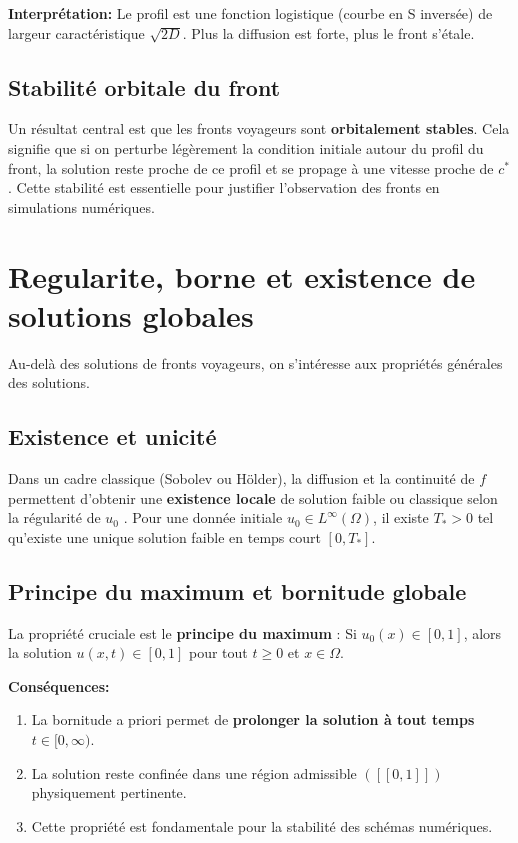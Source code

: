 \documentclass[11pt,a4paper]{report}
\begin{document}
\textbf{Interprétation:} Le profil est une fonction logistique (courbe en S inversée) 
de largeur caractéristique $\sqrt{2D}$. Plus la diffusion est forte, plus le front s'étale.

\subsection*{Stabilité orbitale du front}
Un résultat central est que les fronts voyageurs sont \textbf{orbitalement stables}.
Cela signifie que si on perturbe légèrement la condition initiale autour du profil du front,
la solution reste proche de ce profil et se propage à une vitesse proche de $c^*$.
Cette stabilité est essentielle pour justifier l'observation des fronts en simulations numériques.

\section{Regularite, borne et existence de solutions globales}
Au-delà des solutions de fronts voyageurs, on s'intéresse aux propriétés générales des solutions.

\subsection*{Existence et unicité}
Dans un cadre classique (Sobolev ou Hölder), la diffusion et la continuité de $f$ permettent d'obtenir une
\textbf{existence locale} de solution faible ou classique selon la régularité de $u_0$ \cite{EvansGariepy2015}.
Pour une donnée initiale $u_0 \in L^\infty(\Omega)$, il existe $T_* > 0$ tel qu'existe une unique solution
faible en temps court $[0, T_*]$.

\subsection*{Principe du maximum et bornitude globale}
La propriété cruciale est le \textbf{principe du maximum} \cite{FifeMcLeod1977}:
Si $u_0(x) \in [0,1]$, alors la solution $u(x,t) \in [0,1]$ pour tout $t \geq 0$ et $x \in \Omega$.

\textbf{Conséquences:}
\begin{enumerate}[leftmargin=2em]
  \item La bornitude a priori permet de \textbf{prolonger la solution à tout temps} $t \in [0,\infty)$.
  \item La solution reste confinée dans une région admissible $([\![0,1]\!])$ physiquement pertinente.
  \item Cette propriété est fondamentale pour la stabilité des schémas numériques.
\end{enumerate}
\end{document}
